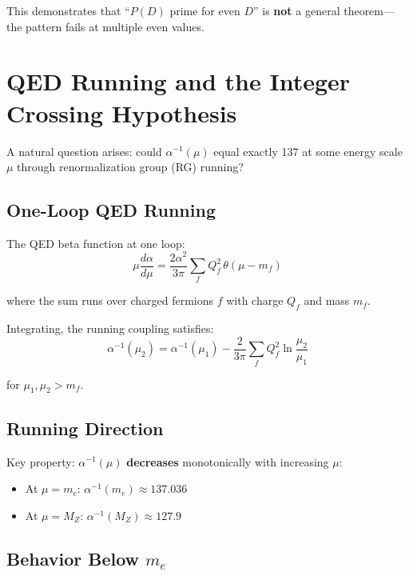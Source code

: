 \documentclass[11pt,a4paper]{article}
\begin{document}
This demonstrates that ``$P(D)$ prime for even $D$'' is \textbf{not} a general theorem---the pattern fails at multiple even values.

\section{QED Running and the Integer Crossing Hypothesis}

A natural question arises: could $\alpha^{-1}(\mu)$ equal exactly 137 at some energy scale $\mu$ through renormalization group (RG) running?

\subsection{One-Loop QED Running}

The QED beta function at one loop:
\begin{equation}
\mu \frac{d\alpha}{d\mu} = \frac{2\alpha^2}{3\pi} \sum_f Q_f^2 \, \theta(\mu - m_f)
\end{equation}

where the sum runs over charged fermions $f$ with charge $Q_f$ and mass $m_f$.

Integrating, the running coupling satisfies:
\begin{equation}
\alpha^{-1}(\mu_2) = \alpha^{-1}(\mu_1) - \frac{2}{3\pi} \sum_f Q_f^2 \ln\frac{\mu_2}{\mu_1}
\end{equation}

for $\mu_1, \mu_2 > m_f$.

\subsection{Running Direction}

Key property: $\alpha^{-1}(\mu)$ \textbf{decreases} monotonically with increasing $\mu$:
\begin{itemize}
    \item At $\mu = m_e$: $\alpha^{-1}(m_e) \approx 137.036$
    \item At $\mu = M_Z$: $\alpha^{-1}(M_Z) \approx 127.9$
\end{itemize}

\subsection{Behavior Below $m_e$}
\end{document}
